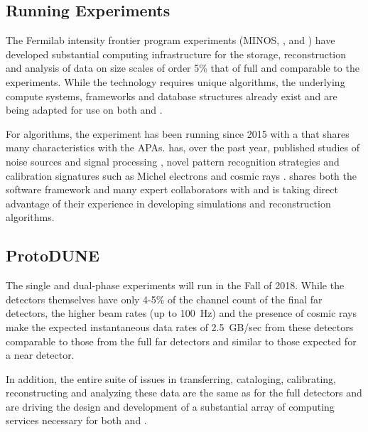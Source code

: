\subsection{Running Experiments}\label{sw:IF-input}

The Fermilab intensity frontier program experiments (MINOS\cite{minosNIM},  \cite{minerva}, \cite{microboone} and  \cite{Adamson:2016xxw}) have developed substantial computing infrastructure for the storage, reconstruction and analysis of data on size scales of order 5\% that of full   and comparable to the  experiments. While the \lartpc technology requires unique algorithms, the underlying compute systems, frameworks and database structures already exist and are being adapted for use on both  and  .

For algorithms, the  \cite{Acciarri:2016smi} experiment has been running since 2015 with a \lartpc that shares many characteristics with the   APAs.     has, over the past year, published studies of noise sources and signal processing \cite{Acciarri:2017sde,Adams:2018dra}, novel pattern recognition strategies \cite{Acciarri:2016ryt,Acciarri:2017hat} and calibration signatures such as Michel electrons and cosmic rays \cite{Acciarri:2017sjy,Acciarri:2017sde}.    shares both the \larsoft software framework and many expert collaborators with   and is taking direct advantage of their experience in developing simulations and reconstruction algorithms.


\subsection{ProtoDUNE}\label{sw:PD-planning}

The  single and dual-phase experiments will run in the Fall of 2018.  While the detectors themselves have only 4-5\% of the channel count  of the final far detectors, the higher beam rates (up to 100~Hz) and the presence of cosmic rays make the expected instantaneous data rates of 2.5~GB/sec from these detectors comparable to those from the full far detectors and similar to those expected for a near detector. 

In addition, the entire suite of issues in transferring, cataloging, calibrating, reconstructing and analyzing these data are the same as for the full detectors and are driving the design and development of a substantial array of computing services necessary for both  and  .

